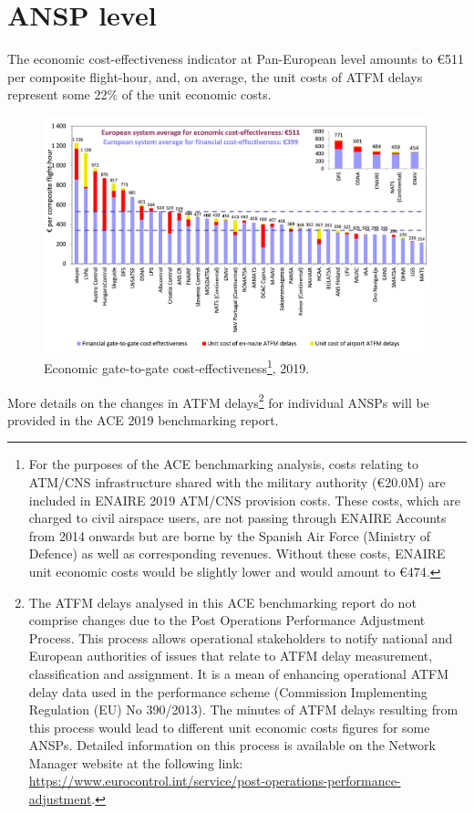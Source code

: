 \documentclass[
]{book}
\begin{document}
\hypertarget{ansp-level}{%
\section{ANSP level}\label{ansp-level}}

The economic cost-effectiveness indicator at Pan-European level amounts to €511 per composite flight-hour, and, on average, the unit costs of ATFM delays represent some 22\% of the unit economic costs.



\begin{figure}

{\centering \includegraphics[width=1\linewidth]{figures/Figure 3-2} 

}

\caption{Economic gate-to-gate cost-effectiveness\footnote{For the purposes of the ACE benchmarking analysis, costs relating to ATM/CNS infrastructure shared with the military authority (€20.0M) are included in ENAIRE 2019 ATM/CNS provision costs. These costs, which are charged to civil airspace users, are not passing through ENAIRE Accounts from 2014 onwards but are borne by the Spanish Air Force (Ministry of Defence) as well as corresponding revenues. Without these costs, ENAIRE unit economic costs would be slightly lower and would amount to €474.}, 2019.}\label{fig:figure10}
\end{figure}

More details on the changes in ATFM delays\footnote{The ATFM delays analysed in this ACE benchmarking report do not comprise changes due to the Post Operations Performance Adjustment Process. This process allows operational stakeholders to notify national and European authorities of issues that relate to ATFM delay measurement, classification and assignment. It is a mean of enhancing operational ATFM delay data used in the performance scheme (Commission Implementing Regulation (EU) No 390/2013). The minutes of ATFM delays resulting from this process would lead to different unit economic costs figures for some ANSPs. Detailed information on this process is available on the Network Manager website at the following link: \url{https://www.eurocontrol.int/service/post-operations-performance-adjustment}.} for individual ANSPs will be provided in the ACE 2019 benchmarking report.
\end{document}
